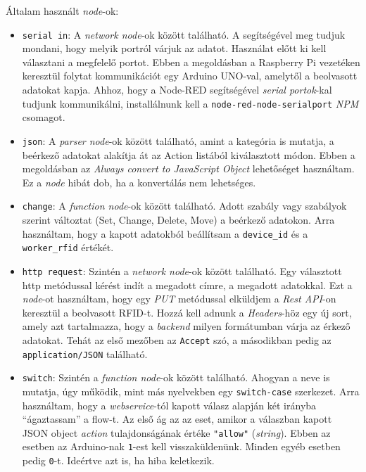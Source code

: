 \documentclass[
]{thesis-ekf}
\theoremstyle{definition}
\theoremstyle{remark}
\begin{document}
Általam használt \emph{node}-ok:
\begin{itemize}
    \item \verb|serial in|: A \emph{network node}-ok között található. A segítségével meg tudjuk mondani, hogy melyik portról várjuk az adatot. Használat előtt ki kell választani a megfelelő portot. Ebben a megoldásban a Raspberry Pi vezetéken keresztül folytat kommunikációt egy Arduino UNO-val, amelytől a beolvasott adatokat kapja. Ahhoz, hogy a Node-RED segítségével \emph{serial portok}-kal tudjunk kommunikálni, installálnunk kell a \texttt{node-red-node-serialport} \emph{NPM} csomagot. \cite{nodered-serial}
    
    \item \verb|json|: A \emph{parser node}-ok között található, amint a kategória is mutatja, a beérkező adatokat alakítja át az Action listából kiválasztott módon. Ebben a megoldásban az \emph{Always convert to JavaScript Object} lehetőséget használtam. Ez a \emph{node} hibát dob, ha a konvertálás nem lehetséges.
    
    \item \verb|change|: A \emph{function node}-ok között található. Adott szabály vagy szabályok szerint változtat (Set, Change, Delete, Move) a beérkező adatokon. Arra használtam, hogy a kapott adatokból beállítsam a \texttt{device\_id} és a \texttt{worker\_rfid} értékét. 
    
    \item \verb|http request|: Szintén a \emph{network node}-ok között található. Egy választott http metódussal kérést indít a megadott címre, a megadott adatokkal. Ezt a \emph{node}-ot használtam, hogy egy \emph{PUT} metódussal elküldjem a \emph{Rest API}-on keresztül a beolvasott RFID-t. Hozzá kell adnunk a \emph{Headers}-höz egy új sort, amely azt tartalmazza, hogy a \emph{backend} milyen formátumban várja az érkező adatokat. Tehát az első mezőben az \texttt{Accept} szó, a másodikban pedig az \texttt{application/JSON} található. 
    
    \item \verb|switch|: Szintén a \emph{function node}-ok között található. Ahogyan a neve is mutatja, úgy működik, mint más nyelvekben egy \texttt{switch-case} szerkezet. Arra használtam, hogy a \emph{webservice}-tól kapott válasz alapján két irányba \enquote{ágaztassam} a flow-t. Az első ág az az eset, amikor a válaszban kapott JSON object \emph{action} tulajdonságának értéke \texttt{"allow"} (\emph{string}). Ebben az esetben az Arduino-nak \texttt{1}-est kell visszaküldenünk. Minden egyéb esetben pedig \texttt{0}-t. Ideértve azt is, ha hiba keletkezik.
    

\end{itemize}
\end{document}
